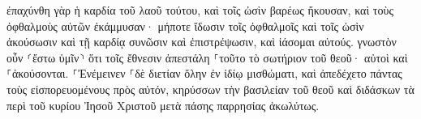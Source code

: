 \documentclass{openreader}
\begin{document}
ἐπαχύνθη γὰρ ἡ καρδία τοῦ λαοῦ τούτου, καὶ τοῖς ὠσὶν βαρέως ἤκουσαν, καὶ τοὺς ὀφθαλμοὺς αὐτῶν ἐκάμμυσαν· μήποτε ἴδωσιν τοῖς ὀφθαλμοῖς καὶ τοῖς ὠσὶν ἀκούσωσιν καὶ τῇ καρδίᾳ συνῶσιν καὶ ἐπιστρέψωσιν, καὶ ἰάσομαι αὐτούς. 
γνωστὸν οὖν ⸂ἔστω ὑμῖν⸃ ὅτι τοῖς ἔθνεσιν ἀπεστάλη ⸀τοῦτο τὸ σωτήριον τοῦ θεοῦ· αὐτοὶ καὶ ⸀ἀκούσονται. 
⸀Ἐνέμεινεν ⸀δὲ διετίαν ὅλην ἐν ἰδίῳ μισθώματι, καὶ ἀπεδέχετο πάντας τοὺς εἰσπορευομένους πρὸς αὐτόν, 
κηρύσσων τὴν βασιλείαν τοῦ θεοῦ καὶ διδάσκων τὰ περὶ τοῦ κυρίου Ἰησοῦ Χριστοῦ μετὰ πάσης παρρησίας ἀκωλύτως. 
\end{document}
